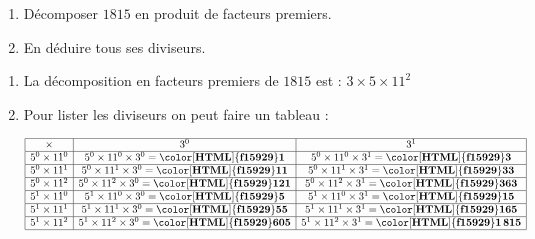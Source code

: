 \begin{exercice*}
    \begin{enumerate}
        \item Décomposer $\num{1815}$ en produit de facteurs premiers.
        \item En déduire tous ses diviseurs.
    \end{enumerate}

\end{exercice*}
\begin{corrige}

    \begin{enumerate}
        \item La décomposition en facteurs premiers de $\num{1815}$ est : $3\times 5\times 11^{2}$ 
        \item Pour lister les diviseurs on peut faire un tableau :
        
        \smallskip
        $
        \begin{array}{|c|c|c|}
        \hline
        \times & 3^{0} & 3^{1}\\
        \hline
        5^{0}\times11^{0} & 5^{0}\times11^{0}\times3^{0}=\mathbf{{\color[HTML]{f15929}1}} & 5^{0}\times11^{0}\times3^{1}=\mathbf{{\color[HTML]{f15929}3}}\\
        \hline
        5^{0}\times11^{1} & 5^{0}\times11^{1}\times3^{0}=\mathbf{{\color[HTML]{f15929}11}} & 5^{0}\times11^{1}\times3^{1}=\mathbf{{\color[HTML]{f15929}33}}\\
        \hline
        5^{0}\times11^{2} & 5^{0}\times11^{2}\times3^{0}=\mathbf{{\color[HTML]{f15929}121}} & 5^{0}\times11^{2}\times3^{1}=\mathbf{{\color[HTML]{f15929}363}}\\
        \hline
        5^{1}\times11^{0} & 5^{1}\times11^{0}\times3^{0}=\mathbf{{\color[HTML]{f15929}5}} & 5^{1}\times11^{0}\times3^{1}=\mathbf{{\color[HTML]{f15929}15}}\\
        \hline
        5^{1}\times11^{1} & 5^{1}\times11^{1}\times3^{0}=\mathbf{{\color[HTML]{f15929}55}} & 5^{1}\times11^{1}\times3^{1}=\mathbf{{\color[HTML]{f15929}165}}\\
        \hline
        5^{1}\times11^{2} & 5^{1}\times11^{2}\times3^{0}=\mathbf{{\color[HTML]{f15929}605}} & 5^{1}\times11^{2}\times3^{1}=\mathbf{{\color[HTML]{f15929}1\,815}}\\
        \hline
        \end{array}
        $
        \smallskip


\end{enumerate}
\end{corrige}
